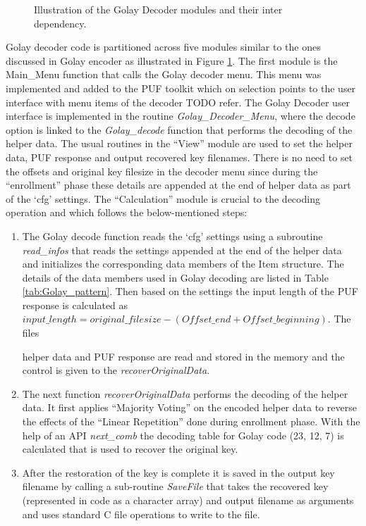 	\begin{figure}
	\centering
	\caption{Illustration of the Golay Decoder modules and their inter dependency.}
	\label{img:golay_decoder_fns}
	\end{figure}

	Golay decoder code is partitioned across five modules similar to the ones discussed in Golay encoder as illustrated in Figure \ref{img:golay_decoder_fns}. The first module is the Main\_Menu function that calls the Golay decoder menu. This menu was implemented and added to the PUF toolkit which on selection points to the user interface with menu items of the decoder TODO refer. The Golay Decoder user interface is implemented in the routine \emph{Golay\_Decoder\_Menu}, where the decode option is linked to the \emph{Golay\_decode}
	function that performs the decoding of the helper data. The usual routines in the ``View'' module are used to set the helper data, PUF response and output recovered key filenames. There is no need to set the offsets and original key filesize in the decoder menu since during the ``enrollment'' phase these details are appended at the end of helper data as part of the `cfg' settings. The ``Calculation'' module is crucial to the decoding operation and which follows the below-mentioned
	steps:
	\begin{enumerate}
		\item The Golay decode function reads the `cfg' settings using a subroutine \emph{read\_infos} that reads the settings appended at the end of the helper data and initializes the corresponding data members of the Item structure. The details of the data members used in Golay decoding are listed in Table \ref{tab:Golay_pattern}. Then based on the settings the input length of the PUF response is calculated as $input\_length = original\_filesize - (Offset\_end + Offset\_beginning)$. The files

			helper data and PUF response are read and stored in the memory and the control is given to the \emph{recoverOriginalData}.
		\item The next function \emph{recoverOriginalData} performs the decoding of the helper data. It first applies ``Majority Voting'' on the encoded helper data to reverse the effects of the ``Linear Repetition'' done during enrollment phase. With the help of an API \emph{next\_comb} the decoding table for Golay code (23, 12, 7) is calculated that is used to recover the original key.
		\item After the restoration of the key is complete it is saved in the output key filename by calling a
			sub-routine \emph{SaveFile} that takes the recovered key (represented in code as a character array) and output filename as arguments and uses standard C file operations to write to the file.
	\end{enumerate}

